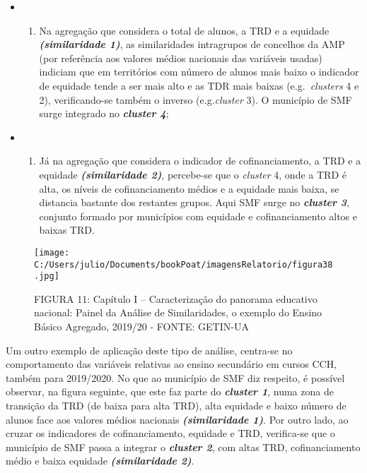 \documentclass[
]{book}
\providecommand{\tightlist}{%
  \setlength{\itemsep}{0pt}\setlength{\parskip}{0pt}}
\begin{document}
\begin{itemize}
\item
  \begin{enumerate}
  \def\labelenumi{\roman{enumi})}
  \tightlist
  \item
    Na agregação que considera o total de alunos, a TRD e a equidade \textbf{\emph{(similaridade 1)}}, as similaridades intragrupos de concelhos da AMP (por referência aos valores médios nacionais das variáveis usadas) indiciam que em territórios com número de alunos mais baixo o indicador de equidade tende a ser mais alto e as TDR mais baixas (e.g.~\emph{clusters} 4 e 2), verificando-se também o inverso (e.g.\emph{cluster} 3). O município de SMF surge integrado no \textbf{\emph{cluster 4}};
  \end{enumerate}
\item
  \begin{enumerate}
  \def\labelenumi{\roman{enumi})}
  \setcounter{enumi}{1}
  \tightlist
  \item
    Já na agregação que considera o indicador de cofinanciamento, a TRD e a equidade \textbf{\emph{(similaridade 2)}}, percebe-se que o \emph{cluster} 4, onde a TRD é alta, os níveis de cofinanciamento médios e a equidade mais baixa, se distancia bastante dos restantes grupos. Aqui SMF surge no \textbf{\emph{cluster 3}}, conjunto formado por municípios com equidade e cofinanciamento altos e baixas TRD.
  \end{enumerate}
\end{itemize}

\begin{figure}
\centering
\texttt{[image: C:/Users/julio/Documents/bookPoat/imagensRelatorio/figura38.jpg]}
\caption{FIGURA 11: Capítulo I -- Caracterização do panorama educativo nacional: Painel da Análise de Similaridades, o exemplo do Ensino Básico Agregado, 2019/20 - FONTE: GETIN-UA}
\end{figure}

Um outro exemplo de aplicação deste tipo de análise, centra-se no comportamento das variáveis relativas ao ensino secundário em cursos CCH, também para 2019/2020. No que ao município de SMF diz respeito, é possível observar, na figura seguinte, que este faz parte do \textbf{\emph{cluster 1}}, numa zona de transição da TRD (de baixa para alta TRD), alta equidade e baixo número de alunos face aos valores médios nacionais \textbf{\emph{(similaridade 1)}}. Por outro lado, ao cruzar os indicadores de cofinanciamento, equidade e TRD, verifica-se que o município de SMF passa a integrar o \textbf{\emph{cluster 2}}, com altas TRD, cofinanciamento médio e baixa equidade \textbf{\emph{(similaridade 2)}}.
\end{document}

